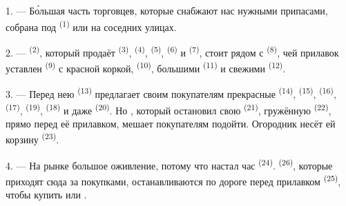 
\VUsaut{4.0mm}
\VUsaut{3.0mm}

\VUsaut{3.0mm}

1. --- Бо́льшая часть торговцев, которые снабжают нас нужными припасами,
собрана под  \textsuperscript{(1)}  или на
соседних улицах.

2. ---  \textsuperscript{(2)}, который продаёт 
\textsuperscript{(3)},  \textsuperscript{(4)},
 \textsuperscript{(5)},  \textsuperscript{(6)} и
 \textsuperscript{(7)}, стоит рядом с  \textsuperscript{(8)}, чей прилавок уставлен 
\textsuperscript{(9)} с красной коркой,  \textsuperscript{(10)},
большими  \textsuperscript{(11)} и свежими
 \textsuperscript{(12)}.

3. --- Перед нею  \textsuperscript{(13)} предлагает своим
покупателям прекрасные  \textsuperscript{(14)},
 \textsuperscript{(15)},  \textsuperscript{(16)},
 \textsuperscript{(17)},  \textsuperscript{(19)},
 \textsuperscript{(18)} и даже  \textsuperscript{(20)}. Но
, который остановил свою 
\textsuperscript{(21)}, гружённую  \textsuperscript{(22)},
прямо перед её прилавком, мешает покупателям подойти. Огородник несёт ей
корзину  \textsuperscript{(23)}.

\VUsaut{4.0mm}
\VUsaut{3.0mm}

4. --- На рынке большое оживление, потому что настал час 
\textsuperscript{(24)}.  \textsuperscript{(26)}, которые приходят сюда
за покупками, останавливаются по дороге перед прилавком
 \textsuperscript{(25)}, чтобы купить 
или .

